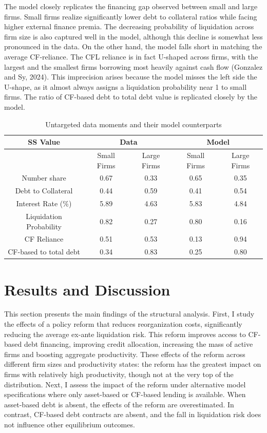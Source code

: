 \documentclass[12pt]{article}
\begin{document}
The model closely replicates the financing gap observed between small and large firms. Small firms realize significantly lower debt to collateral ratios while facing higher external finance premia. The decreasing probability of liquidation across firm size is also captured well in the model, although this decline is somewhat less pronounced in the data. On the other hand, the model falls short in matching the average CF-reliance. The CFL reliance is in fact U-shaped across firms, with the largest and the smallest firms borrowing most heavily against cash flow (Gonzalez and Sy, 2024). This imprecision arises because the model misses the left side the U-shape, as it almost always assigns a liquidation probability near 1 to small firms. The ratio of CF-based debt to total debt value is replicated closely by the model. 

\begin{table}[h!]
    \centering
    \begin{tabular}{c|cc||cc}
    \textbf{SS Value} &  \multicolumn{2}{c}{\textbf{Data}} & \multicolumn{2}{c}{\textbf{Model}} \\ 
    \toprule
     & Small Firms & Large Firms & Small Firms & Large Firms  \\ 
    \midrule
    Number share & 0.67 & 0.33 & 0.65 & 0.35 \\ 
    Debt to Collateral & 0.44 & 0.59 & 0.41 & 0.54 \\ 
    Interest Rate (\%) & 5.89 & 4.63 & 5.83 & 4.84 \\ 
    Liquidation Probability & 0.82 & 0.27 & 0.80 & 0.16 \\ 
    CF Reliance & 0.51 & 0.53 & 0.13 & 0.94 \\ 
    CF-based to total debt & 0.34 & 0.83 & 0.25 & 0.80 \\ 
    \bottomrule
    \end{tabular}
    \caption{Untargeted data moments and their model counterparts}
    \label{tab:untargeted}
\end{table}


\section{Results and Discussion \label{sec:results}}

This section presents the main findings of the structural analysis. First, I study the effects of a policy reform that reduces reorganization costs, significantly reducing the average ex-ante liquidation risk. This reform improves access to CF-based debt financing, improving credit allocation, increasing the mass of active firms and boosting aggregate productivity. These effects of the reform across different firm sizes and productivity states: the reform has the greatest impact on firms with relatively high productivity, though not at the very top of the distribution. Next, I assess the impact of the reform under alternative model specifications where only asset-based or CF-based lending is available. When asset-based debt is absent, the effects of the reform are overestimated. In contrast, CF-based debt contracts are absent, and the fall in liquidation risk does not influence other equilibrium outcomes.
\end{document}
